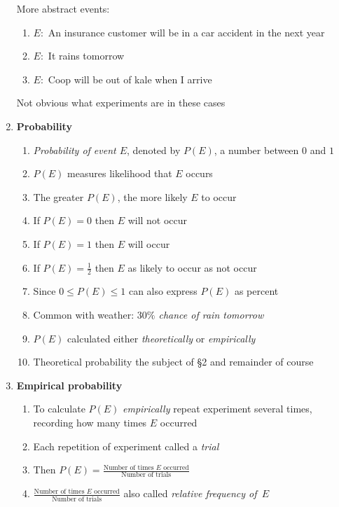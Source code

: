 \documentclass{ximera}
\begin{document}
\begin{enumerate}
\begin{example}
More abstract events:
\begin{enumerate}
\item $E:$ An insurance customer will be in a car accident in the next year
\item $E:$ It rains tomorrow
\item $E:$ Coop will be out of kale when I arrive
\end{enumerate}
Not obvious what experiments are in these cases
\end{example}

\item{\bf Probability}
\begin{enumerate}
\item {\em Probability of event $E$}, denoted by $P\left(E\right)$,
a number between $0$ and $1$
\item $P\left(E\right)$ measures likelihood that $E$ occurs
\item The greater $P\left(E\right)$, the more likely $E$ to occur
\item If $P\left(E\right)=0$ then $E$ will not occur
\item If $P\left(E\right)=1$ then $E$ will occur
\item If $P\left(E\right)=\frac{1}{2}$ then $E$ 
as likely to occur as not occur
\item Since $0\le P\left(E\right)\le 1$ can also express
$P\left(E\right)$ as percent
\item Common with weather: {\em $30\%$ chance of rain tomorrow}
\item $P\left(E\right)$ calculated either {\em theoretically}
or {\em empirically}
\item Theoretical probability the subject of \S2 and remainder of course
\end{enumerate}

\item{\bf Empirical probability}
\begin{enumerate}
\item To calculate $P\left(E\right)$ {\em empirically}
repeat experiment several times, recording how
many times $E$ occurred
\item Each repetition of experiment called a {\em trial}
\item Then $P\left(E\right)=
\frac{\text{Number of times $E$ occurred}}
{\text{Number of trials}}$
\item $\frac{\text{Number of times $E$ occurred}}
{\text{Number of trials}}$ also called
{\em relative frequency of~$E$}
\end{enumerate}


\end{enumerate}
\end{document}
